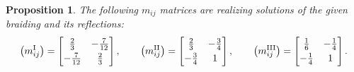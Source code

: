 \documentclass[10pt,a4paper]{amsart}
\numberwithin{equation}{section}
\newtheorem{prop}[teo]{Proposition}
\begin{document}
\begin{prop}
The following $m_{ij}$ matrices are realizing solutions of the given braiding and its reflections:
\[\big(m_{ij}^{\mathrm{I}}\big)= \begin{bmatrix}
 \frac{2}{3} & -\frac{7}{12}\vspace{1mm}\\
 -\frac{7}{12} & \frac{2}{3}
\end{bmatrix}, \qquad
\big(m_{ij}^{\mathrm{II}}\big)= \begin{bmatrix}
 \frac{2}{3} & -\frac{3}{4}\vspace{1mm}\\
 -\frac{3}{4} & 1
\end{bmatrix}, \qquad
\big(m_{ij}^{\mathrm{III}}\big)= \begin{bmatrix}
 \frac{1}{6} & -\frac{1}{4}\vspace{1mm}\\
 -\frac{1}{4} & 1
\end{bmatrix}. \]
\end{prop}
\end{document}
